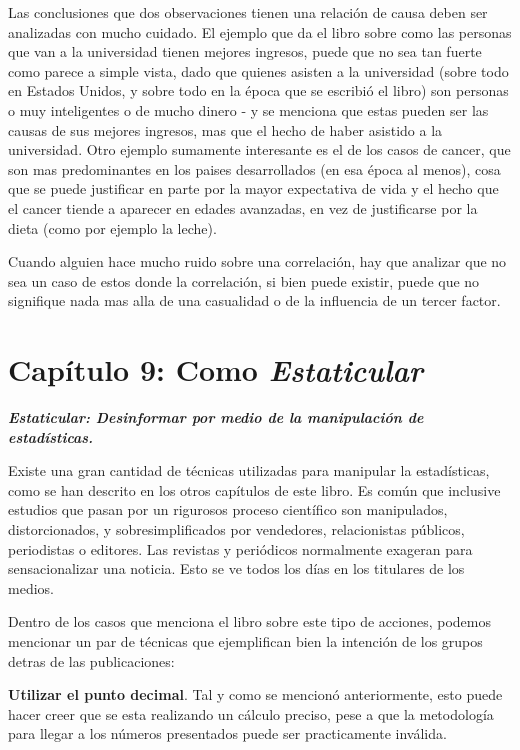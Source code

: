\documentclass[letterpaper, 11pt]{article}
\begin{document}
Las conclusiones que dos observaciones tienen una relación de causa deben ser analizadas con mucho cuidado. El ejemplo que da el libro sobre como las personas que van a la universidad tienen mejores ingresos, puede que no sea tan fuerte como parece a simple vista, dado que quienes asisten a la universidad (sobre todo en Estados Unidos, y sobre todo en la época que se escribió el libro) son personas o muy inteligentes o de mucho dinero - y se menciona que estas pueden ser las causas de sus mejores ingresos, mas que el hecho de haber asistido a la universidad. Otro ejemplo sumamente interesante es el de los casos de cancer, que son mas predominantes en los paises desarrollados (en esa época al menos), cosa que se puede justificar en parte por la mayor expectativa de vida y el hecho que el cancer tiende a aparecer en edades avanzadas, en vez de justificarse por la dieta (como por ejemplo la leche).

Cuando alguien hace mucho ruido sobre una correlación, hay que analizar que no sea un caso de estos donde la correlación, si bien puede existir, puede que no signifique nada mas alla de una casualidad o de la influencia de un tercer factor.

\section*{Capítulo 9: Como \textit{Estaticular}}

\textbf{\textit{Estaticular: Desinformar por medio de la manipulación de estadísticas.}}

Existe una gran cantidad de técnicas utilizadas para manipular la estadísticas, como se han descrito en los otros capítulos de este libro. Es común que inclusive estudios que pasan por un rigurosos proceso científico son manipulados, distorcionados, y sobresimplificados por vendedores, relacionistas públicos, periodistas o editores. Las revistas y periódicos normalmente exageran para sensacionalizar una noticia. Esto se ve todos los días en los titulares de los medios. 

Dentro de los casos que menciona el libro sobre este tipo de acciones, podemos mencionar un par de técnicas que ejemplifican bien la intención de los grupos detras de las publicaciones:

\textbf{Utilizar el punto decimal}. Tal y como se mencionó anteriormente, esto puede hacer creer que se esta realizando un cálculo preciso, pese a que la metodología para llegar a los números presentados puede ser practicamente inválida.
\end{document}
